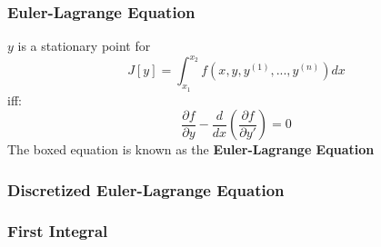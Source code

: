 \subsubsection{Euler-Lagrange Equation}

\begin{theorem}$y$ is a stationary point for
\begin{equation}
J[y] = \int_{x_1}^{x_2} f(x,y,y^{(1)},...,y^{(n)})dx
\end{equation}
iff:
\begin{equation}
\boxed{\frac{\partial f}{\partial y} -\frac{d}{dx}\left(\frac{\partial f}{\partial y'}\right)=0}
\end{equation}
The boxed equation is known as the \textbf{Euler-Lagrange Equation}

\end{theorem}\subsubsection{Discretized Euler-Lagrange Equation}

\subsubsection{First Integral}

